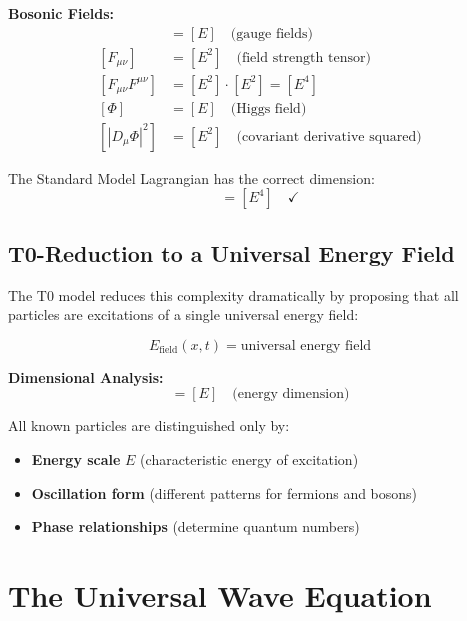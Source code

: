 \documentclass[12pt,a4paper]{report}
\begin{document}
	\textbf{Bosonic Fields:}
	\begin{align}
		[A_\mu] &= [E] \quad \text{(gauge fields)} \\
		[F_{\mu\nu}] &= [E^2] \quad \text{(field strength tensor)} \\
		[F_{\mu\nu}F^{\mu\nu}] &= [E^2] \cdot [E^2] = [E^4] \\
		[\Phi] &= [E] \quad \text{(Higgs field)} \\
		[|D_\mu\Phi|^2] &= [E^2] \quad \text{(covariant derivative squared)}
	\end{align}
	
	The Standard Model Lagrangian has the correct dimension:
	\begin{equation}
		[\mathcal{L}_{\text{SM}}] = [E^4] \quad \checkmark
	\end{equation}
	
	\subsection{T0-Reduction to a Universal Energy Field}
	\label{subsec:t0_reduction}
	
	The T0 model reduces this complexity dramatically by proposing that all particles are excitations of a single universal energy field:
	
	\begin{equation}
		\boxed{E_{\text{field}}(x,t) = \text{universal energy field}}
		\label{eq:universal_energy_field}
	\end{equation}
	
	\textbf{Dimensional Analysis:}
	\begin{equation}
		[E_{\text{field}}] = [E] \quad \text{(energy dimension)}
	\end{equation}
	
	All known particles are distinguished only by:
	\begin{itemize}
		\item \textbf{Energy scale} $E$ (characteristic energy of excitation)
		\item \textbf{Oscillation form} (different patterns for fermions and bosons)
		\item \textbf{Phase relationships} (determine quantum numbers)
	\end{itemize}
	
	\section{The Universal Wave Equation}
	\label{sec:universal_wave_equation}
	
\end{document}
